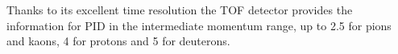 Thanks to its excellent time resolution the TOF detector provides the information for PID in the
intermediate momentum range, up to 2.5 \gevc for pions and kaons, 4 \gevc for protons and 5 \gevc
for deuterons.


 